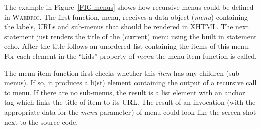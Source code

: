 \documentclass[a4paper]{article}
\def\Waebric{\textsc{Waebric}\xspace}
\def\Var#1{\textit{#1}}
\begin{document}
The example in Figure~\ref{FIG:menus} shows how recursive menus could
be defined in \Waebric. The first function, menu, receives a data
object (\Var{menu}) containing the labels, URLs and sub-menus that
should be rendered in XHTML. The next statement just renders the title
of the (current) menu using the built in statement echo. After
the title follows an unordered list containing the items of this
menu. For each element in the ``kids'' property of \Var{menu} the
menu-item function is called.

The menu-item function first checks whether this \Var{item} has any
children (sub-menus). If so, it produces a li(st) element containing
the output of a recursive call to menu. If there are no sub-menus,
the result is a list element with an anchor tag which links the title
of item to its URL. The result of an invocation (with the appropriate
data for the \textit{menu} parameter) of menu could look like the
screen shot next to the source code.
\end{document}
